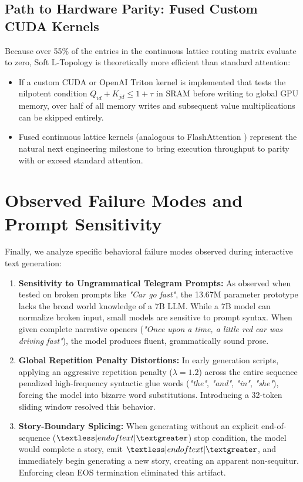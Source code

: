 \subsection{Path to Hardware Parity: Fused Custom CUDA Kernels}
Because over 55\% of the entries in the continuous lattice routing matrix evaluate to zero, Soft L-Topology is theoretically more efficient than standard attention:
\begin{itemize}
    \item If a custom CUDA or OpenAI Triton kernel is implemented that tests the nilpotent condition $Q_{id} + K_{jd} \le 1 + \tau$ in SRAM before writing to global GPU memory, over half of all memory writes and subsequent value multiplications can be skipped entirely.
    \item Fused continuous lattice kernels (analogous to FlashAttention \cite{dao2022flashattention}) represent the natural next engineering milestone to bring execution throughput to parity with or exceed standard attention.
\end{itemize}

\section{Observed Failure Modes and Prompt Sensitivity}
Finally, we analyze specific behavioral failure modes observed during interactive text generation:
\begin{enumerate}
    \item \textbf{Sensitivity to Ungrammatical Telegram Prompts:} As observed when tested on broken prompts like \textit{"Car go fast"}, the 13.67M parameter prototype lacks the broad world knowledge of a 7B LLM. While a 7B model can normalize broken input, small models are sensitive to prompt syntax. When given complete narrative openers (\textit{"Once upon a time, a little red car was driving fast"}), the model produces fluent, grammatically sound prose.
    \item \textbf{Global Repetition Penalty Distortions:} In early generation scripts, applying an aggressive repetition penalty ($\lambda = 1.2$) across the entire sequence penalized high-frequency syntactic glue words (\textit{"the"}, \textit{"and"}, \textit{"in"}, \textit{"she"}), forcing the model into bizarre word substitutions. Introducing a 32-token sliding window resolved this behavior.
    \item \textbf{Story-Boundary Splicing:} When generating without an explicit end-of-sequence ($\textless|endoftext|\textgreater$) stop condition, the model would complete a story, emit $\textless|endoftext|\textgreater$, and immediately begin generating a new story, creating an apparent non-sequitur. Enforcing clean EOS termination eliminated this artifact.
\end{enumerate}
